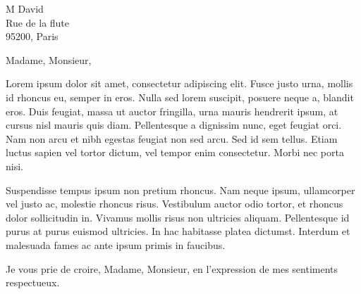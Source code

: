 \documentclass[12pt]{lettre}
\newcommand{\senderName}{Nicolas LE GUERROUE}
\begin{document}
\begin{letter}{M David \\ Rue de la flute \\ 95200, Paris} %
  \name{\senderName}
  \address{\senderName \\ 20 rue du roi Arthur \\ 56270, Ploemeur}
  \nofax


  \def\concname{Objet :~}

  \opening{Madame, Monsieur,}

  Lorem ipsum dolor sit amet, consectetur adipiscing elit. Fusce justo urna, mollis id rhoncus eu, semper in eros. Nulla sed lorem suscipit, posuere neque a, blandit eros. Duis feugiat, massa ut auctor fringilla, urna mauris hendrerit ipsum, at cursus nisl mauris quis diam. Pellentesque a dignissim nunc, eget feugiat orci. Nam non arcu et nibh egestas feugiat non sed arcu. Sed id sem tellus. Etiam luctus sapien vel tortor dictum, vel tempor enim consectetur. Morbi nec porta nisi.

  Suspendisse tempus ipsum non pretium rhoncus. Nam neque ipsum, ullamcorper vel justo ac, molestie rhoncus risus. Vestibulum auctor odio tortor, et rhoncus dolor sollicitudin in. Vivamus mollis risus non ultricies aliquam. Pellentesque id purus at purus euismod ultricies. In hac habitasse platea dictumst. Interdum et malesuada fames ac ante ipsum primis in faucibus.

  \closing{Je vous prie de croire, Madame, Monsieur, en l’expression de mes sentiments respectueux.}
  \signature{\senderName}
\end{letter}
\end{document}
